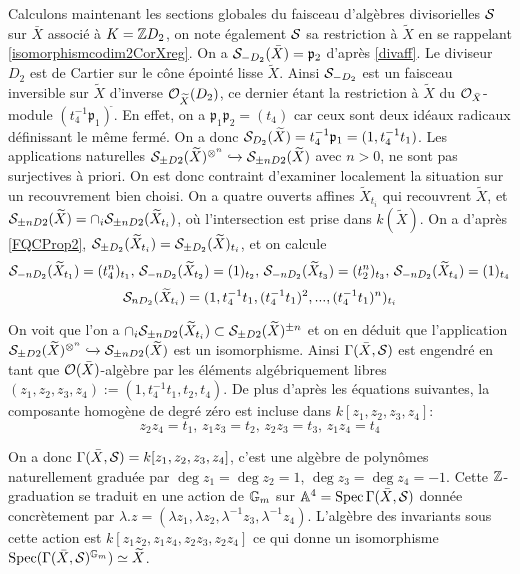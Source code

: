 Calculons maintenant les sections globales du faisceau d'algèbres divisorielles $\mathcal{S}$ sur $\bar{X}$ associé à $K=\mathbb{Z} D_2$, on note également $\mathcal{S}$ sa restriction à $\widetilde{X}$ en se rappelant \ref{isomorphismcodim2CorXreg}. On a $\mathcal{S}_{-D_2}(\bar{X})=\mathfrak{p}_2$ d'après \ref{divaff}. Le diviseur $D_2$ est de Cartier sur le cône épointé lisse $\widetilde{X}$. Ainsi $\mathcal{S}_{-D_2}$ est un faisceau inversible sur $\widetilde{X}$ d'inverse $\mathcal{O}_{\widetilde{X}}(D_2)$, ce dernier étant la restriction à $\widetilde{X}$ du $\mathcal{O}_{\bar{X}}$-module $(t_4^{-1}\mathfrak{p}_1)^{\widetilde{}}$. En effet, on a $\mathfrak{p}_1\mathfrak{p}_2=(t_4)$ car ceux sont deux idéaux radicaux définissant le même fermé.  On a donc $\mathcal{S}_{D_2}(\widetilde{X})=t_4^{-1}\mathfrak{p}_1=(1, t_4^{-1}t_1)$. Les applications naturelles $\mathcal{S}_{\pm D2}(\widetilde{X})^{\otimes ^n}\xhookrightarrow{} \mathcal{S}_{\pm nD2}(\widetilde{X})$ avec $n>0$, ne sont pas surjectives à priori. On est donc contraint d'examiner localement la situation sur un recouvrement bien choisi. On a quatre ouverts affines $\widetilde{X}_{t_i}$ qui recouvrent $\widetilde{X}$, et $\mathcal{S}_{\pm nD2}(\widetilde{X})=\cap_i \mathcal{S}_{\pm nD2}(\widetilde{X}_{t_i})$, où l'intersection est prise dans $k(\widetilde{X})$. On a d'après \ref{FQCProp2}, $\mathcal{S}_{\pm D_2}(\widetilde{X}_{t_i})=\mathcal{S}_{\pm D_2}(\widetilde{X})_{t_i}$, et on calcule 
$$\mathcal{S}_{-nD_2}(\widetilde{X}_{t_1})=(t_4^n)_{t_1},\,\mathcal{S}_{-nD_2}(\widetilde{X}_{t_2})=(1)_{t_2},\,\mathcal{S}_{-nD_2}(\widetilde{X}_{t_3})=(t_2^n)_{t_3},\,\mathcal{S}_{-nD_2}(\widetilde{X}_{t_4})=(1)_{t_4}$$
$$\mathcal{S}_{nD_2}(\widetilde{X}_{t_i})=(1,t_4^{-1}t_1,(t_4^{-1}t_1)^2,...,(t_4^{-1}t_1)^n)_{t_i}$$

On voit que l'on a $\cap_i \mathcal{S}_{\pm nD2}(\widetilde{X}_{t_i})\subset \mathcal{S}_{\pm D2}(\widetilde{X})^{\pm n}$ et on en déduit que l'application $\mathcal{S}_{\pm D2}(\widetilde{X})^{\otimes ^n}\xhookrightarrow{} \mathcal{S}_{\pm nD2}(\widetilde{X})$ est un isomorphisme. Ainsi $\Gamma(\bar{X},\mathcal{S})$ est engendré en tant que $\mathcal{O}(\bar{X})$-algèbre par les éléments algébriquement libres $(z_1,z_2,z_3,z_4):=(1, t_4^{-1}t_1,t_2,t_4)$. De plus d'après les équations suivantes, la composante homogène de degré zéro est incluse dans $k[z_1,z_2,z_3,z_4]$:
$$ z_2z_4=t_1,\, z_1z_3=t_2,\, z_2z_3=t_3,\, z_1z_4=t_4$$

On a donc $\Gamma(\bar{X}, \mathcal{S})=k[z_1,z_2,z_3,z_4]$, c'est une algèbre de polynômes naturellement graduée par $\deg z_1=\deg z_2=1$, $\deg z_3=\deg z_4=-1$. Cette $\mathbb{Z}$-graduation se traduit en une action de $\mathbb{G}_m$ sur $\mathbb{A}^4=\operatorname{Spec} \Gamma(\bar{X}, \mathcal{S})$ donnée  concrètement par $\lambda.z=(\lambda z_1,\lambda z_2,\lambda^{-1} z_3,\lambda^{-1} z_4)$. L'algèbre des invariants sous cette action est $k[z_1z_2,z_1z_4,z_2z_3,z_2z_4]$ ce qui donne un isomorphisme $\operatorname{Spec}(\Gamma(\bar{X},\mathcal{S})^{\mathbb{G}_m})\simeq \widetilde{X}$.

